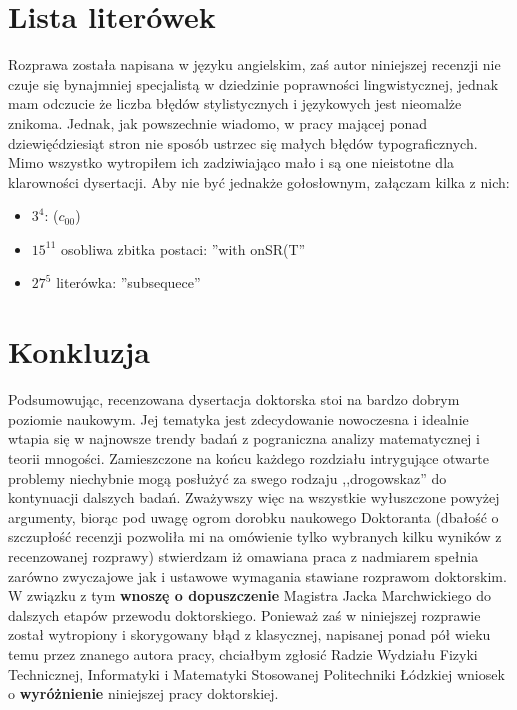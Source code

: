 \documentclass[12pt]{article}
\begin{document}
\section{Lista literówek}

Rozprawa została napisana w języku angielskim, zaś
autor niniejszej recenzji nie czuje się
bynajmniej specjalistą w dziedzinie poprawności lingwistycznej, jednak
mam odczucie że liczba błędów stylistycznych i językowych jest 
nieomalże znikoma. Jednak, jak powszechnie wiadomo, w pracy mającej ponad dziewięćdziesiąt
stron nie sposób ustrzec się małych błędów typograficznych. Mimo
wszystko wytropiłem ich zadziwiająco mało i są one 
nieistotne dla klarowności dysertacji. Aby nie być 
jednakże gołosłownym, załączam kilka z nich:

\begin{itemize}
\item
  $3^4$: ($c_{00}$)
\item 
  $15^{11}$ osobliwa zbitka postaci: ''with onSR(T''
\item
  $27^5$ literówka: ''subsequece''
\end{itemize}

\section{Konkluzja}
Podsumowując, recenzowana dysertacja doktorska stoi
na bardzo dobrym poziomie naukowym. Jej tematyka jest
zdecydowanie nowoczesna i idealnie wtapia się w najnowsze
trendy badań z pograniczna analizy matematycznej i teorii mnogości.
Zamieszczone na końcu każdego rozdziału intrygujące otwarte problemy
niechybnie mogą posłużyć za swego rodzaju ,,drogowskaz'' 
do kontynuacji dalszych badań.
  Zważywszy więc na wszystkie wyłuszczone powyżej argumenty,
biorąc pod uwagę ogrom dorobku naukowego Doktoranta (dbałość o 
szczupłość recenzji pozwoliła mi na omówienie tylko wybranych
kilku wyników z recenzowanej rozprawy) stwierdzam iż omawiana 
praca z nadmiarem spełnia zarówno zwyczajowe jak i ustawowe
wymagania stawiane rozprawom doktorskim. W związku z tym
{\bf wnoszę o dopuszczenie} Magistra Jacka Marchwickiego do dalszych
etapów przewodu doktorskiego.
  Ponieważ zaś w niniejszej rozprawie został wytropiony i 
skorygowany błąd z klasycznej, napisanej ponad pół wieku temu przez znanego
autora pracy, chciałbym zgłosić Radzie Wydziału Fizyki 
Technicznej, Informatyki i Matematyki Stosowanej Politechniki
Łódzkiej wniosek o {\bf wyróżnienie} niniejszej pracy doktorskiej.
\end{document}
